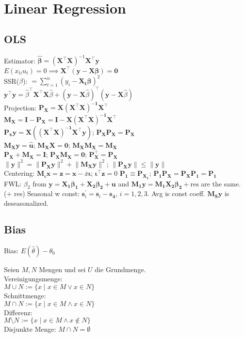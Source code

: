 \section{Linear Regression}
\subsection*{OLS}
Estimator: $\hat{\mathbf{\beta}} = (\mathbf{X}^{\top}\mathbf{X})^{-1}\mathbf{X}^{\top}\mathbf{y}$\\
$E(x_{ti}u_t) = 0 \implies \mathbf{X}^{\top}(\mathbf{y}-\mathbf{X}\mathbf{\beta}) = \mathbf{0}$\\
SSR($\beta$): $= \sum_{t=1}^{n}(y_i - \mathbf{X_t}\mathbf{\beta})^2$\\
$\mathbf{y}^{\top} \mathbf{y} = \hat{\beta}^{\top} \mathbf{X}^{\top}\mathbf{X}\hat{\beta} + (\mathbf{y} - \mathbf{X}\hat{\beta} )^{\top} (\mathbf{y} - \mathbf{X}\hat{\beta})$\\
Projection: $\mathbf{P_X = X(X^{\top} X)^{-1} X^{\top}}$\\
$\mathbf{M_X = I- P_X = I - X(X^{\top} X)^{-1} X^{\top}}$\\
$\mathbf{P_x y = X((X^{\top}X)^{-1}X^{\top}y)}$; $\mathbf{P_X P_X = P_X}$\\
$\mathbf{M_X y = \hat{u}}$; $\mathbf{M_X X = 0}$; $\mathbf{M_X M_X = M_X}$\\
$\mathbf{P_X + M_X = I}$; $\mathbf{P_X M_X} = \mathbf{0}$; $\mathbf{P_X ^{\top} = P_X}$\\
$\lVert \mathbf{y} \rVert ^2 = \lVert \mathbf{P_X y} \rVert ^2 + \lVert \mathbf{M_X y} \rVert ^2$; $\lVert \mathbf{P_X y \rVert \leq \lVert \mathbf{y} \rVert}$\\
Centering: $\mathbf{M_{\iota}x = z = x} - \bar{x}\mathbf{\iota}$; $\mathbf{\iota^{\top} z} = 0$
$\mathbf{P_1 \equiv P_{X_1}}$; $\mathbf{P_1 P_X = P_X P_1 = P_1}$\\
FWL: $\beta_2$ from $\mathbf{y = X_1\beta_1 +X_2 \beta_2 + u}$ and $\mathbf{M_1 y = M_1 X_2 \beta_2} + \text{res}$  are the same. (+ res)
Seasonal w const: $\mathbf{s}_i ^{\prime} = \mathbf{s}_i - \mathbf{s_4}$, $i=1,2,3$.
Avg is const coeff.
$\mathbf{M_{S}y}$ is deseasonalized.
\subsection*{Bias}
Bias: $E(\hat{\theta}) - \theta_0$

Seien $M, N$ Mengen und sei $U$ die Grundmenge.\\
Vereinigungsmenge:\\
$M\cup N:=\{x\mid x\in M\vee x\in N\}$\\
Schnittmenge:\\
$M\cap N:=\{x\mid x\in M\wedge x\in N\}$\\
Differenz:\\
$M\setminus N:=\{x\mid x\in M\wedge x\notin N\}$\\
Disjunkte Menge: $M\cap N=\emptyset$
